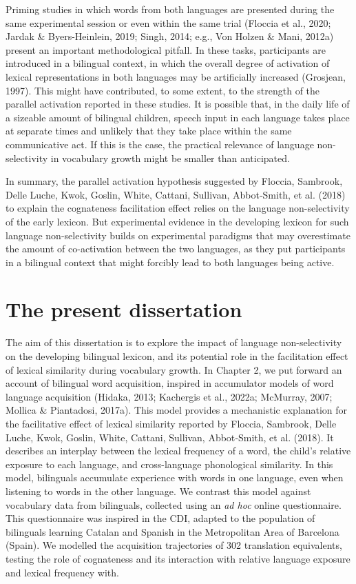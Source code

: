 \documentclass[
  12pt,
  b5paperpaper,
  twoside]{scrreprt}
\begin{document}
Priming studies in which words from both languages are presented during
the same experimental session or even within the same trial (Floccia et
al., 2020; Jardak \& Byers-Heinlein, 2019; Singh, 2014; e.g., Von Holzen
\& Mani, 2012a) present an important methodological pitfall. In these
tasks, participants are introduced in a bilingual context, in which the
overall degree of activation of lexical representations in both
languages may be artificially increased (Grosjean, 1997). This might
have contributed, to some extent, to the strength of the parallel
activation reported in these studies. It is possible that, in the daily
life of a sizeable amount of bilingual children, speech input in each
language takes place at separate times and unlikely that they take place
within the same communicative act. If this is the case, the practical
relevance of language non-selectivity in vocabulary growth might be
smaller than anticipated.

In summary, the parallel activation hypothesis suggested by Floccia,
Sambrook, Delle Luche, Kwok, Goslin, White, Cattani, Sullivan,
Abbot‐Smith, et al. (2018) to explain the cognateness facilitation
effect relies on the language non-selectivity of the early lexicon. But
experimental evidence in the developing lexicon for such language
non-selectivity builds on experimental paradigms that may overestimate
the amount of co-activation between the two languages, as they put
participants in a bilingual context that might forcibly lead to both
languages being active.

\hypertarget{the-present-dissertation}{%
\section{The present dissertation}\label{the-present-dissertation}}

The aim of this dissertation is to explore the impact of language
non-selectivity on the developing bilingual lexicon, and its potential
role in the facilitation effect of lexical similarity during vocabulary
growth. In Chapter 2, we put forward an account of bilingual word
acquisition, inspired in accumulator models of word language acquisition
(Hidaka, 2013; Kachergis et al., 2022a; McMurray, 2007; Mollica \&
Piantadosi, 2017a). This model provides a mechanistic explanation for
the facilitative effect of lexical similarity reported by Floccia,
Sambrook, Delle Luche, Kwok, Goslin, White, Cattani, Sullivan,
Abbot‐Smith, et al. (2018). It describes an interplay between the
lexical frequency of a word, the child's relative exposure to each
language, and cross-language phonological similarity. In this model,
bilinguals accumulate experience with words in one language, even when
listening to words in the other language. We contrast this model against
vocabulary data from bilinguals, collected using an \emph{ad hoc} online
questionnaire. This questionnaire was inspired in the CDI, adapted to
the population of bilinguals learning Catalan and Spanish in the
Metropolitan Area of Barcelona (Spain). We modelled the acquisition
trajectories of 302 translation equivalents, testing the role of
cognateness and its interaction with relative language exposure and
lexical frequency with.
\end{document}
